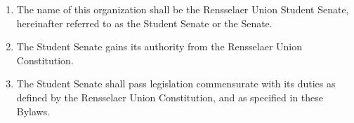 \begin{enumerate}
\item The name of this organization shall be the Rensselaer Union Student Senate, hereinafter referred to as the Student Senate or the
Senate.
\item The Student Senate gains its authority from the Rensselaer Union Constitution.
\item The Student Senate shall pass legislation commensurate with its duties as defined by the Rensselaer Union Constitution, and as
specified in these Bylaws.
\end{enumerate}